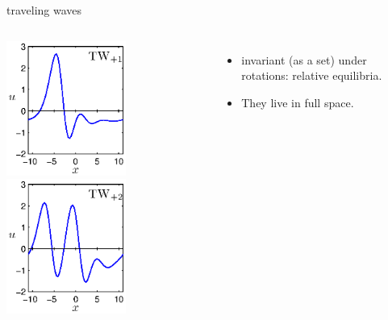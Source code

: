 \documentclass{beamer}
\begin{document}
\begin{frame}{traveling waves}
 \begin{columns}
 \includegraphics[width=0.6\textwidth,clip=true]{../../figs/ks22_TW1_profile}\\
 \includegraphics[width=0.6\textwidth,clip=true]{../../figs/ks22_TW2_profile}%
 \begin{itemize}
 \item invariant (as a set) under rotations: relative equilibria.
 \item They live in full space.

\end{itemize}

 \end{columns}
\end{frame}
\end{document}
